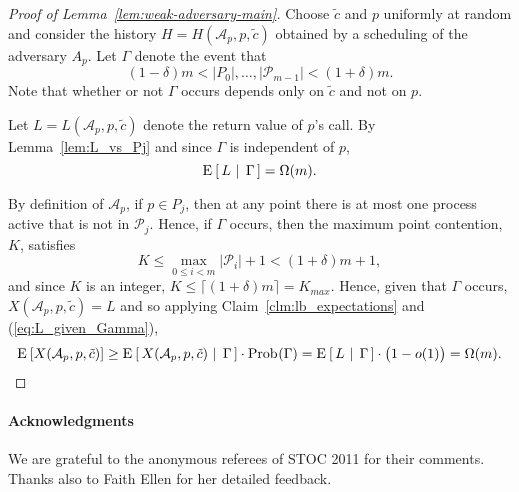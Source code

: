 \documentclass[11pt,letterpaper]{article}
\makeatletter
\newcommand{\paren}[1]{{\left({#1}\right)}}
\newcommand{\bparen}[1]{{\bigl({#1}\bigr)}}
\providecommand{\@prob}{{\mathrm{Prob}}}
\newcommand{\Prob}[2][]{\@prob_{#1}\paren{#2}}
\providecommand{\@Exp}{{\mathrm{E}}}
\newcommand{\Exp}[2][]{\@Exp_{#1}\left[{#2}\right]}
\newcommand{\CondExp}[3][]{\Exp[#1]{\,#2\,\left\vert\vphantom{#2#3}\right.\,#3\,}}
\renewcommand{\AA}{\mathcal{A}}
\newcommand{\PP}{\mathcal{P}}
\newcommand{\tc}{{\tilde{c}}}
\makeatother
\begin{document}
\begin{proof}[Proof of Lemma~\ref{lem:weak-adversary-main}]
  Choose $\tc$ and $p$ uniformly at random and consider the history $H=H(\AA_p,p,\tc)$ obtained by a scheduling of the adversary $A_p$.
  Let $\Gamma$ denote the event that
  \begin{displaymath}
    (1-\delta)m<|P_0|,\dots,|\PP_{m-1}|<(1+\delta)m.
  \end{displaymath}
  Note that whether or not $\Gamma$ occurs depends only on $\tc$ and not on $p$.

  Let $L=L(\AA_p,p,\tc)$ denote the return value of $p$'s \FAI{} call.
  By Lemma~\ref{lem:L_vs_Pj} and since $\Gamma$ is independent of $p$,
  \begin{equation}\label{eq:L_given_Gamma}
    \CondExp{L}{\Gamma}=\Omega(m).
  \end{equation}

  By definition of $\AA_p$, if $p\in P_j$, then at any point there is at most one process active that is not in $\PP_{j}$.
  Hence, if $\Gamma$ occurs, then the maximum point contention, $K$, satisfies
  \begin{displaymath}
    K\leq\max_{0\leq i<m}|\PP_i|+1<(1+\delta)m+1,
  \end{displaymath}
  and since $K$ is an integer, $K\leq\lceil(1+\delta)m\rceil=K_{max}$.
  Hence, given that $\Gamma$ occurs, $X(\AA_p,p,\tc)=L$ and so applying Claim~\ref{clm:lb_expectations} and (\ref{eq:L_given_Gamma}),
  \begin{displaymath}
    \Exp{X(\AA_p,p,\tc)}
    \geq
    \CondExp{X(\AA_p,p,\tc)}{\Gamma}\cdot\Prob{\Gamma}
    =
    \CondExp{L}{\Gamma}\cdot\bparen{1-o(1)}
    =\Omega(m).
  \end{displaymath}
\end{proof}




\paragraph{Acknowledgments}
We are grateful to the anonymous referees of STOC 2011 for their comments.
Thanks also to Faith Ellen for her detailed feedback.
\end{document}
